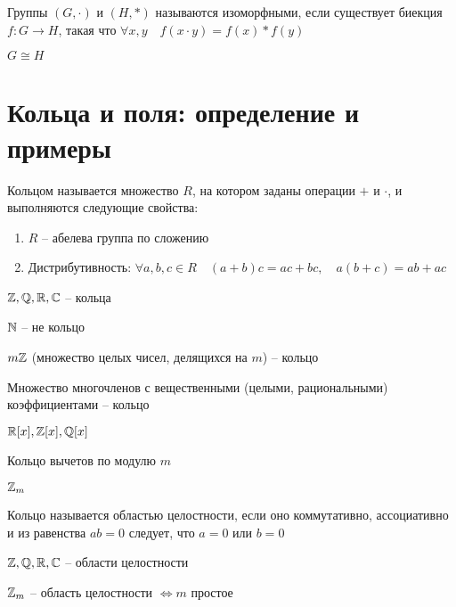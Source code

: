 \begin{definition}
	Группы $(G, \cdot)$ и $(H, *)$ называются изоморфными, если существует биекция $f : G \to H$, такая что $ \forall x, y \quad f(x \cdot y) = f(x) * f(y)$
	\begin{notation}
		$G \cong H$
	\end{notation}
\end{definition}

\section{Кольца и поля: определение и примеры}

\begin{definition}
	Кольцом называется множество $R$, на котором заданы операции $+$ и $\cdot$, и  выполняются следующие свойства:
	\begin{enumerate}
		\item $R$ -- абелева группа по сложению
		\item Дистрибутивность: $ \forall a, b, c \in R \quad (a + b)c = ac + bc, \quad a(b + c) = ab + ac $
	\end{enumerate}
\end{definition}

\begin{exmpls}
	\item $\mathbb{Z}, \mathbb{Q}, \mathbb{R}, \mathbb{C}$ -- кольца
	\item $\mathbb{N}$ -- не кольцо
	\item $m\mathbb{Z}$ (множество целых чисел, делящихся на $m$) -- кольцо
	\item Множество многочленов с вещественными (целыми, рациональными) коэффициентами -- кольцо
	\begin{notation}
		$\mathbb{R}[x], \mathbb{Z}[x], \mathbb{Q}[x]$
	\end{notation}
	\item Кольцо вычетов по модулю $m$
	\begin{notation}
		$\mathbb{Z}_m$
	\end{notation}
\end{exmpls}

\begin{definition}
	Кольцо называется областью целостности, если оно коммутативно, ассоциативно и из равенства $ab = 0$ следует, что $a = 0$ или $b = 0$
\end{definition}

\begin{exmpls}
	\item $\mathbb{Z}, \mathbb{Q}, \mathbb{R}, \mathbb{C}$ -- области целостности
	\item $\mathbb{Z}_m$ -- область целостности $ \iff m $ простое
\end{exmpls}

